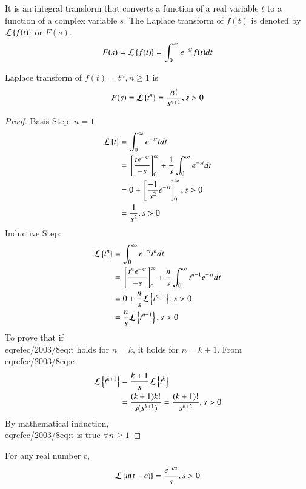 %
\begin{definition}
It is an integral transform that converts a function of a real variable $t$ to a function of a complex variable $s$. The Laplace transform of $f(t)$ is denoted by $\mathcal{L}\left\{f(t)\right\}$ or $F(s)$.
\begin{align}
    F(s)=\mathcal{L}\left\{f(t)\right\}=\int_{0}^{\infty}e^{-st}f(t)dt
\end{align}
\end{definition}
\begin{remark}
Laplace transform of $f(t)=t^n,n\geq1$ is
\begin{align}
    F(s)=\mathcal{L}\left\{t^n\right\}=\dfrac{n!}{s^{n+1}},s>0
    \label{ec/2013/8eq:t}
\end{align}
\end{remark}
\begin{proof}
Basis Step: $n=1$
\begin{align}
    \mathcal{L}\left\{t\right\}&=\int_{0}^{\infty}e^{-st}tdt\\
    &={}\left[\dfrac{te^{-st}}{-s}\right]_{0}^{\infty}+\dfrac{1}{s}\int_{0}^{\infty}e^{-st}dt\\
    &=0+{}\left[\dfrac{-1}{s^2}e^{-st}\right]_{0}^{\infty},s>0\\
    &=\dfrac{1}{s^2},s>0
\end{align}
Inductive Step:
\begin{align}
    \mathcal{L}\left\{t^n\right\}&=\int_{0}^{\infty}e^{-st}t^ndt\\
    &={}\left[\dfrac{t^{n}e^{-st}}{-s}\right]_{0}^{\infty}+\dfrac{n}{s}\int_{0}^{\infty}t^{n-1}e^{-st}dt\\
    &=0+\dfrac{n}{s}\mathcal{L}\left\{t^{n-1}\right\},s>0\\
    &=\dfrac{n}{s}\mathcal{L}\left\{t^{n-1}\right\},s>0\label{ec/2013/8eq:e}
\end{align}
To prove that if \\eqref{ec/2003/8eq:t} holds for $n=k$, it holds for $n=k+1$. From \\eqref{ec/2003/8eq:e}
\begin{align}
    \mathcal{L}\left\{t^{k+1}\right\}&=\dfrac{k+1}{s}\mathcal{L}\left\{t^{k}\right\}\\
    &=\dfrac{(k+1)k!}{s(s^{k+1})}=\dfrac{(k+1)!}{s^{k+2}},s>0
\end{align}
By mathematical induction, \\eqref{ec/2003/8eq:t} is true $\forall n\geq 1$
\end{proof}
\begin{lemma}
For any real number c, 
\begin{align}
    \mathcal{L}\left\{u(t-c)\right\}=\dfrac{e^{-cs}}{s}, s>0
    \label{ec/2013/8eq:u}
\end{align}
\end{lemma}
